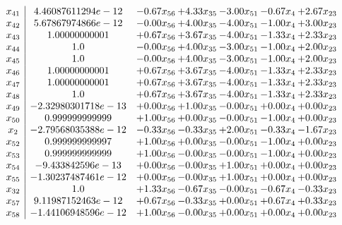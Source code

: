 \documentclass[8pt]{article}
\begin{document}
\[\begin{array}{c| c c@{\hskip 2pt} c@{\hskip 2pt} c@{\hskip 2pt} c@{\hskip 2pt} c@{\hskip 2pt} }
 x_{41}   &  4.46087611294e-12 & -0.67 x_{56} & +  4.33 x_{35} & -3.00 x_{51} & -0.67 x_{4} & +  2.67 x_{23}\\
 x_{42}   &  5.67867974866e-12 & -0.00 x_{56} & +  4.00 x_{35} & -4.00 x_{51} & -1.00 x_{4} & +  3.00 x_{23}\\
 x_{43}   &  1.00000000001 & +  0.67 x_{56} & +  3.67 x_{35} & -4.00 x_{51} & -1.33 x_{4} & +  2.33 x_{23}\\
 x_{44}   &  1.0 & -0.00 x_{56} & +  4.00 x_{35} & -3.00 x_{51} & -1.00 x_{4} & +  2.00 x_{23}\\
 x_{45}   &  1.0 & -0.00 x_{56} & +  4.00 x_{35} & -3.00 x_{51} & -1.00 x_{4} & +  2.00 x_{23}\\
 x_{46}   &  1.00000000001 & +  0.67 x_{56} & +  3.67 x_{35} & -4.00 x_{51} & -1.33 x_{4} & +  2.33 x_{23}\\
 x_{47}   &  1.00000000001 & +  0.67 x_{56} & +  3.67 x_{35} & -4.00 x_{51} & -1.33 x_{4} & +  2.33 x_{23}\\
 x_{48}   &  1.0 & +  0.67 x_{56} & +  3.67 x_{35} & -4.00 x_{51} & -1.33 x_{4} & +  2.33 x_{23}\\
 x_{49}   &  -2.32980301718e-13 & +  0.00 x_{56} & +  1.00 x_{35} & -0.00 x_{51} & +  0.00 x_{4} & +  0.00 x_{23}\\
 x_{50}   &  0.999999999999 & +  1.00 x_{56} & +  0.00 x_{35} & -0.00 x_{51} & -1.00 x_{4} & +  0.00 x_{23}\\
 x_{2}   &  -2.79568035388e-12 & -0.33 x_{56} & -0.33 x_{35} & +  2.00 x_{51} & -0.33 x_{4} & -1.67 x_{23}\\
 x_{52}   &  0.999999999997 & +  1.00 x_{56} & +  0.00 x_{35} & -0.00 x_{51} & -1.00 x_{4} & +  0.00 x_{23}\\
 x_{53}   &  0.999999999999 & +  1.00 x_{56} & -0.00 x_{35} & -0.00 x_{51} & -1.00 x_{4} & +  0.00 x_{23}\\
 x_{54}   &  -9.433842596e-13 & +  0.00 x_{56} & -0.00 x_{35} & +  1.00 x_{51} & +  0.00 x_{4} & +  0.00 x_{23}\\
 x_{55}   &  -1.30237487461e-12 & +  0.00 x_{56} & -0.00 x_{35} & +  1.00 x_{51} & +  0.00 x_{4} & +  0.00 x_{23}\\
 x_{32}   &  1.0 & +  1.33 x_{56} & -0.67 x_{35} & -0.00 x_{51} & -0.67 x_{4} & -0.33 x_{23}\\
 x_{57}   &  9.11987152463e-12 & +  0.67 x_{56} & -0.33 x_{35} & +  0.00 x_{51} & +  0.67 x_{4} & +  0.33 x_{23}\\
 x_{58}   &  -1.44106948596e-12 & +  1.00 x_{56} & -0.00 x_{35} & +  0.00 x_{51} & +  0.00 x_{4} & +  0.00 x_{23}\\

\end{array}\]
\end{document}
